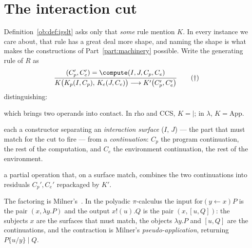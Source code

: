 \section{The interaction cut}
\label{ob:subsec:cut}

Definition~\ref{ob:def:igslt} asks only that \emph{some} rule mention $K$. In every
instance we care about, that rule has a great deal more shape, and naming the shape is
what makes the constructions of Part~\ref{part:machinery} possible. Write the generating rule of $R$ as
\[
  \frac{(C_p', C_e') = \compute(I, J, C_p, C_e)}
       {K\bigl(K_p(I, C_p),\, K_e(J, C_e)\bigr) \longrightarrow K'\bigl(C_p', C_e'\bigr)}
  \tag{$\dagger$}
\]
distinguishing:

\begin{description}[leftmargin=1.5em,style=nextline]
\item[the interaction constructor $K$,] which brings two operands into contact. In rho
  and CCS, $K = {\mid}$; in $\lambda$, $K = \mathrm{App}$.

\item[two introductions $K_p(I,C_p)$ and $K_e(J,C_e)$,] each a constructor separating an
  \emph{interaction surface} ($I$, $J$) --- the part that must match for the cut to fire
  --- from a \emph{continuation}: $C_p$ the program continuation, the rest of the
  computation, and $C_e$ the environment continuation, the rest of the environment.

\item[the contraction $\compute$,] a partial operation that, on a surface match,
  combines the two continuations into residuals $C_p', C_e'$ repackaged by $K'$.
\end{description}

The factoring is Milner's~\cite{Milner1992}. In the polyadic $\pi$-calculus the input
$\mathrm{for}(y \leftarrow x)P$ is the pair $(x, \lambda y.P)$ and the output $x!(u).Q$
is the pair $(x, [u,Q])$: the subjects $x$ are the surfaces that must match, the objects
$\lambda y.P$ and $[u,Q]$ are the continuations, and the contraction is Milner's
\emph{pseudo-application}, returning $P\{u/y\} \mid Q$.

\begin{center}
\end{center}

